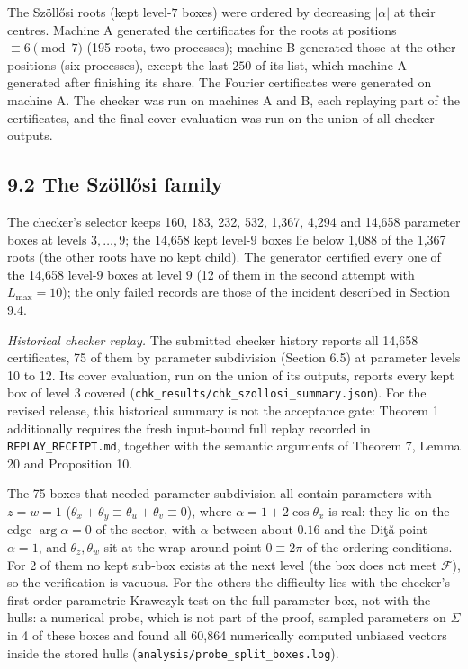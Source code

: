 \documentclass[
  11pt,
]{article}
\begin{document}
The Szöllősi roots (kept level-\(7\) boxes) were ordered by decreasing
\(|\alpha|\) at their centres. Machine A generated the certificates for
the roots at positions \(\equiv6\pmod7\) (195 roots, two processes);
machine B generated those at the other positions (six processes), except
the last \(250\) of its list, which machine A generated after finishing
its share. The Fourier certificates were generated on machine A. The
checker was run on machines A and B, each replaying part of the
certificates, and the final cover evaluation was run on the union of all
checker outputs.

\subsection{9.2 The Szöllősi family}\label{the-szuxf6llux151si-family-1}

The checker's selector keeps 160, 183, 232, 532, 1,367, 4,294 and 14,658
parameter boxes at levels \(3,\dots,9\); the 14,658 kept level-\(9\)
boxes lie below 1,088 of the 1,367 roots (the other roots have no kept
child). The generator certified every one of the 14,658 level-\(9\)
boxes at level \(9\) (12 of them in the second attempt with
\(L_{\max}=10\)); the only failed records are those of the incident
described in Section 9.4.

\emph{Historical checker replay.} The submitted checker history reports
all 14,658 certificates, 75 of them by parameter subdivision (Section
6.5) at parameter levels 10 to 12. Its cover evaluation, run on the
union of its outputs, reports every kept box of level \(3\) covered
(\texttt{chk\_results/chk\_szollosi\_summary.json}). For the revised
release, this historical summary is not the acceptance gate: Theorem 1
additionally requires the fresh input-bound full replay recorded in
\texttt{REPLAY\_RECEIPT.md}, together with the semantic arguments of
Theorem 7, Lemma 20 and Proposition 10.

The 75 boxes that needed parameter subdivision all contain parameters
with \(z=w=1\) (\(\theta_x+\theta_y\equiv\theta_u+\theta_v\equiv0\)),
where \(\alpha=1+2\cos\theta_x\) is real: they lie on the edge
\(\arg\alpha=0\) of the sector, with \(\alpha\) between about \(0.16\)
and the Diţă point \(\alpha=1\), and \(\theta_z,\theta_w\) sit at the
wrap-around point \(0\equiv2\pi\) of the ordering conditions. For 2 of
them no kept sub-box exists at the next level (the box does not meet
\(\mathcal F\)), so the verification is vacuous. For the others the
difficulty lies with the checker's first-order parametric Krawczyk test
on the full parameter box, not with the hulls: a numerical probe, which
is not part of the proof, sampled parameters on \(\Sigma\) in 4 of these
boxes and found all 60,864 numerically computed unbiased vectors inside
the stored hulls (\texttt{analysis/probe\_split\_boxes.log}).
\end{document}

